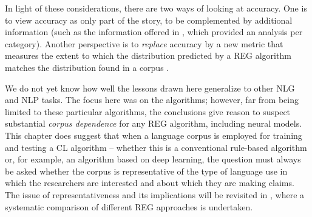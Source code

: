 In light of these considerations, there are two ways of looking at accuracy. One is to view accuracy as only part of the story, to be complemented by additional information (such as the information offered in , which provided an analysis per category). Another perspective is to {\em replace} accuracy by a new metric that measures the extent to which the distribution predicted by a REG algorithm matches the distribution found in a corpus \citep{Gompel2019}.

We do not yet know how well the lessons drawn here generalize to other NLG and NLP tasks. The focus here was on the \grec algorithms; however, far from being limited to these particular algorithms, the conclusions give reason to suspect substantial \emph{corpus dependence} for any REG algorithm, including neural models. This chapter does suggest that when a language corpus is employed for training and testing a CL algorithm -- whether this is a conventional rule-based algorithm or, for example, an algorithm based on deep learning, the question must always be asked whether the corpus is representative of the type of language use in which the researchers are interested and about which they are making claims. The issue of representativeness and its implications will be revisited in , where a systematic comparison of different REG approaches is undertaken.



